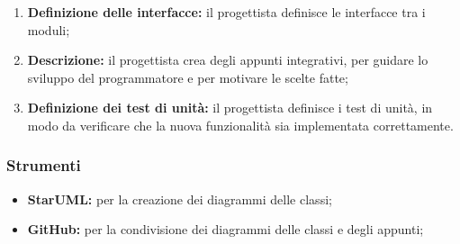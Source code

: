 \begin{itemize}
\begin{enumerate}
		      \item \textbf{Definizione delle interfacce:} il
		            progettista definisce le interfacce tra i moduli;

		      \item \textbf{Descrizione:} il progettista crea degli appunti
		            integrativi, per guidare lo sviluppo del programmatore e
		            per motivare le scelte fatte;

		      \item \textbf{Definizione dei test di unità:} il progettista
		            definisce i test di unità, in modo da verificare che la
		            nuova funzionalità sia implementata correttamente.
	      \end{enumerate}
\end{itemize}

\subsubsection{Strumenti}
\begin{itemize}
	\item \textbf{StarUML:} per la creazione dei diagrammi delle classi;
	\item \textbf{GitHub:} per la condivisione dei diagrammi delle classi e
	      degli appunti;
\end{itemize}

